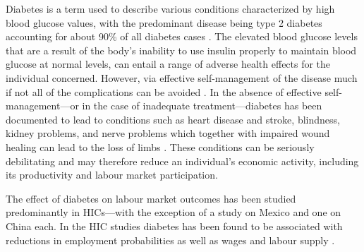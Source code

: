 Diabetes is a term used to describe various conditions characterized by high blood glucose values, with the predominant disease being type 2 diabetes accounting for about 90\% of all diabetes cases \parencite{Sicree2009}. The elevated
blood glucose levels that are a result of the body's inability to use insulin properly to maintain blood glucose at normal levels, can entail a range of adverse health effects for the individual concerned. However, via effective self-management of the disease much if not all of the complications can be avoided \parencite{Lim2011, Gregg2012}. In the absence of effective self-management---or in the case of inadequate treatment---diabetes has been documented to lead to conditions such as heart disease and stroke, blindness, kidney problems, and nerve problems which together with impaired wound healing can lead to the loss of limbs \parencite{Reynoso-Noveron2011}. These conditions can be seriously debilitating and may therefore reduce an individual's economic activity, including its productivity and labour market participation.

The effect of diabetes on labour market outcomes has been studied predominantly in \acp{HIC}---with the exception of a study on Mexico \autocite{Seuring2015} and one on China \parencite{Liu2014} each. In the \ac{HIC} studies diabetes has been found to be associated with reductions in employment probabilities as well as wages and labour supply \parencite{Brown2005,Brown2014,BrownIII2011,Minor2011,Minor2013,Minor2015,Latif2009,Seuring2015a}.

